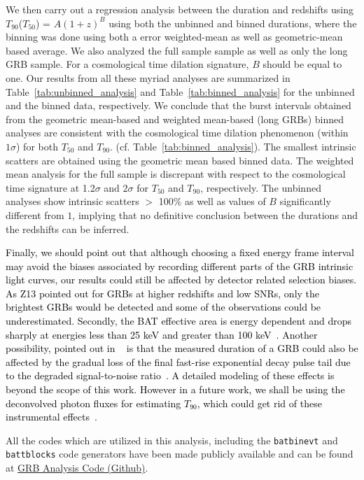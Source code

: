 \documentclass[prd,nofootinbib,preprintnumbers,floatfix]{revtex4}  %
\newcommand{\rthis}[1]{\textcolor{black}{#1}}
\begin{document}
We then carry out a regression analysis between the duration and redshifts using $T_{90}$($T_{50}$) = $A(1+z)^{B}$ using both the unbinned and binned durations, where the binning was done using both a error weighted-mean  as well as geometric-mean based average.
We also analyzed the full sample sample as well as only the long GRB sample. For a cosmological time dilation signature, $B$ should be equal to one. 
Our results from all these myriad analyses are summarized in Table~\ref{tab:unbinned_analysis} and Table~\ref{tab:binned_analysis} for the unbinned and the binned data, respectively.  
We conclude that the burst intervals obtained from the geometric mean-based  and weighted mean-based (long GRBs) binned  analyses are consistent with the cosmological time dilation phenomenon (within $1\sigma$) for both $T_{50}$ and $T_{90}$. (cf. Table~\ref{tab:binned_analysis}). The smallest intrinsic scatters are obtained using the geometric mean based binned data. The weighted mean analysis
for the full sample is discrepant with respect to the cosmological time signature at 1.2$\sigma$ and 2$\sigma$ for $T_{50}$ and $T_{90}$, respectively. The unbinned analyses show intrinsic scatters $>$ 100\% as well as values of $B$ significantly different from $1$, implying that no definitive conclusion between the durations and the redshifts can be inferred. 


\rthis{Finally, we should point out that although choosing a fixed energy frame interval may avoid the biases associated  by recording different parts of the GRB intrinsic light curves, our results could still be affected by detector related selection biases. As Z13 pointed out for GRBs at higher redshifts and low SNRs, only the brightest GRBs would be detected and some of the observations could be underestimated. Secondly, the BAT effective area is energy dependent and drops sharply at energies less than 25 keV and greater than 100 keV~\cite{Barthelmy}. Another possibility, pointed out in ~\cite{Butler} is that the measured duration of a GRB could also be affected by the gradual loss of the final fast-rise exponential decay  pulse tail due to the degraded
signal-to-noise ratio~\cite{Littlejohns}. A detailed modeling of these effects is beyond the scope of this work. However in a future work, we shall be using the deconvolved photon fluxes for estimating $T_{90}$, which could get rid of these instrumental effects~\cite{von}. }

All the codes which are utilized in this analysis, including the {\tt batbinevt} and {\tt battblocks} code generators have been made publicly available and can be found at  \href{https://github.com/Amiteshh/GRB-Analysis}{GRB Analysis Code (Github)}.
\end{document}
